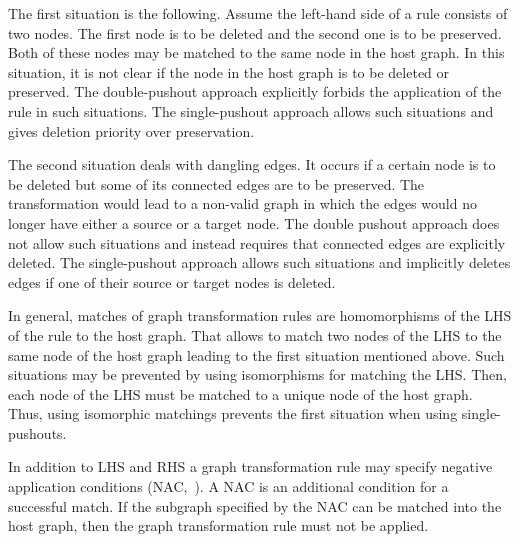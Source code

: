 The first situation is the following. Assume the left-hand side of a rule
consists of two nodes. The first node is to be deleted and the second one is
to be preserved. Both of these nodes may be matched to the same node in the host
graph. In this situation, it is not clear if the node in the host graph is to be
deleted or preserved. The double-pushout approach explicitly forbids the application of the rule in such
situations. The single-pushout approach allows such situations and gives
deletion priority over preservation.

The second situation deals with dangling edges. It occurs if a certain node is
to be deleted but some of its connected edges are to be preserved. The
transformation would lead to a non-valid graph in which the edges would no longer have
either a source or a target node. The double pushout approach does not allow
such situations and instead requires that connected edges are explicitly
deleted. The single-pushout approach allows such situations and implicitly
deletes edges if one of their source or target nodes is deleted.

In general, matches of graph transformation rules are homomorphisms of the LHS of the rule to the host graph.
That allows to match two nodes of the LHS to the same node of the host graph leading to the first situation mentioned above.
Such situations may be prevented by using isomorphisms for matching the LHS. Then, each node of the LHS must be matched to a unique node of the host graph.
Thus, using isomorphic matchings prevents the first situation when using single-pushouts.

In addition to LHS and RHS a graph transformation rule may specify negative application conditions (NAC,~\cite{Roz97}).
A NAC is an additional condition for a successful match.
If the subgraph specified by the NAC can be matched into the host graph, then the graph transformation rule must not be applied.



